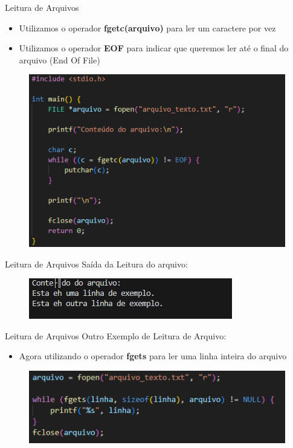 \begin{frame}{Leitura de Arquivos}
\begin{itemize}
    \item Utilizamos o operador \textbf{fgetc(arquivo)} para ler um caractere por vez
    \item Utilizamos o operador \textbf{EOF} para indicar que queremos ler até o final do arquivo (End Of File)
\end{itemize}

    \begin{figure}
        \centering
        \includegraphics[width=0.5\linewidth]{figuras/ArqRead.png}
    \end{figure}
\end{frame}

\begin{frame}{Leitura de Arquivos}
    Saída da Leitura do arquivo:
    \begin{figure}
        \centering
        \includegraphics[width=1\linewidth]{figuras/ArqRead2.png}
    \end{figure}
\end{frame}

\begin{frame}{Leitura de Arquivos}
Outro Exemplo de Leitura de Arquivo:
\begin{itemize}
    \item Agora utilizando o operador \textbf{fgets} para ler uma linha inteira do arquivo
\end{itemize}
    \begin{figure}
        \centering
        \includegraphics[width=1\linewidth]{figuras/ArqLeitura.png}
    \end{figure}
\end{frame}

